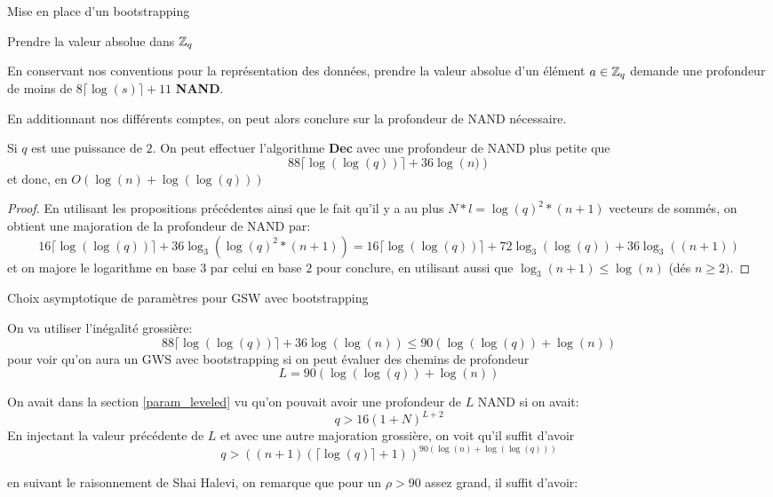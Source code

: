 \begin{section}{Mise en place d'un bootstrapping}
\begin{subsection}{Prendre la valeur absolue dans $\mathbb{Z}_q$}
\begin{prop}
	En conservant nos conventions pour la représentation des données,
	prendre la valeur absolue d'un élément $a\in \mathbb{Z}_q$ demande une
	profondeur de moins de $8\lceil \log(s) \rceil + 11$ \textbf{NAND}.
\end{prop}
En additionnant nos différents comptes, on peut alors conclure sur la
profondeur de NAND nécessaire.
\begin{thm} \label{size_dec}
	Si $q$ est une puissance de $2$.
	On peut effectuer 
	l'algorithme \textbf{Dec} avec une profondeur de NAND plus petite que
	\[88 \lceil \log(\log(q)) \rceil + 36 \log\left(n)\right) \]
	et donc, en $O(\log(n) + \log(\log(q)))$
\end{thm}
\begin{proof}
En utilisant les propositions précédentes ainsi que le fait qu'il y a au plus $N*l = \log(q)^2 * (n+1)$ vecteurs de
sommés, on obtient une majoration de la profondeur de NAND par:
\[16 \lceil \log(\log(q)) \rceil + 36 \log_3\left(\log(q)^2
*(n+1)\right) = 16 \lceil \log(\log(q)) \rceil + 72 \log_3(\log(q)) + 36 \log_3\left((n+1)\right) \]
et on majore le logarithme en base $3$ par celui en base $2$ pour conclure, en
utilisant aussi que $\log_3(n+1) \leq \log(n)$ (dés $n \geq 2)$.
\end{proof}
\end{subsection}
\begin{subsection}{Choix asymptotique de paramètres pour GSW avec bootstrapping}

On va utiliser l'inégalité grossière:
\[
88 \lceil\log(\log(q))\rceil + 36 \log(\log(n)) \leq 90\left(\log(\log(q)) + \log(n)\right) \]
pour voir qu'on aura un GWS avec bootstrapping si on peut évaluer des chemins
de profondeur
\[ L = 90 \left(\log(\log(q)) + \log(n)\right) \]

On avait dans la section \ref{param_leveled} vu qu'on pouvait avoir une
profondeur de $L$ NAND si on avait: 
\begin{equation}
q > 16 {(1+N)}^{L+2}
\end{equation}
En injectant la valeur précédente de $L$ et avec une autre majoration
grossière, on voit qu'il suffit d'avoir
\begin{equation}
q > {\left((n+1)(\lceil \log(q) \rceil + 1 )\right)}^{90 \left(\log(n) +
\log(\log(q))\right)}
\end{equation}

en suivant le raisonnement de Shai Halevi, on remarque 
que pour un $\rho > 90$ assez grand, il suffit d'avoir:


\end{subsection}
\end{section}
